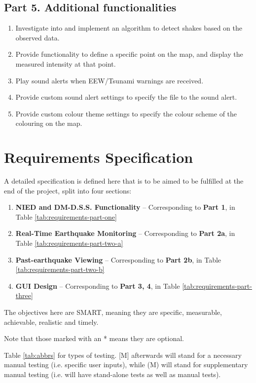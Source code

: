 \subsection{Part 5. Additional functionalities}
\begin{enumerate}
    \item Investigate into and implement an algorithm to detect shakes based on the observed data.
    \item Provide functionality to define a specific point on the map, and display the measured intensity at that point.
    \item Play sound alerts when EEW/Tsunami warnings are received.
    \item Provide custom sound alert settings to specify the file to the sound alert.
    \item Provide custom colour theme settings to specify the colour scheme of the colouring on the map.
\end{enumerate}

\section{Requirements Specification}

A detailed specification is defined here that is to be aimed to be fulfilled at the end of the project, split into four sections:
\begin{enumerate}
    \item \textbf{NIED and DM-D.S.S. Functionality} -- Corresponding to \textbf{Part 1}, in Table \ref{tab:requirements-part-one}
    \item \textbf{Real-Time Earthquake Monitoring} -- Corresponding to \textbf{Part 2a}, in Table \ref{tab:requirements-part-two-a}
    \item \textbf{Past-earthquake Viewing} -- Corresponding to \textbf{Part 2b}, in Table \ref{tab:requirements-part-two-b}
    \item \textbf{GUI Design} -- Corresponding to \textbf{Part 3, 4}, in Table \ref{tab:requirements-part-three}
\end{enumerate}

The objectives here are SMART, meaning they are specific, measurable, achievable, realistic and timely.

Note that those marked with an * means they are optional.

Table \ref{tab:abbrs} for types of testing. [M] afterwards will stand for a necessary manual testing (i.e. specific user inputs), while (M) will stand for supplementary manual testing (i.e. will have stand-alone tests as well as manual tests).

